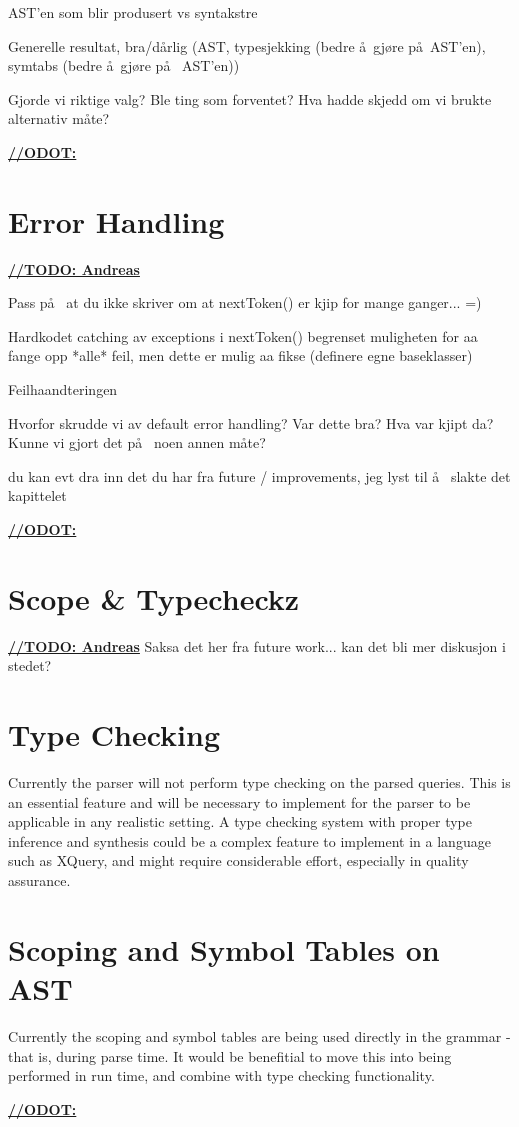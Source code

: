 AST'en som blir produsert vs syntakstre

Generelle resultat, bra/d\aa rlig (AST, typesjekking (bedre \aa~gj\o re p\aa~AST'en),
symtabs (bedre \aa~gj\o re p\aa~ AST'en))

Gjorde vi riktige valg? Ble ting som forventet? Hva hadde skjedd om vi brukte alternativ m\aa te? 

\underline{\textbf{\LARGE //ODOT:}}

\section{Error Handling}
\underline{\textbf{\LARGE //TODO: Andreas}}

Pass p\aa~ at du ikke skriver om at nextToken() er kjip for mange ganger... =)

Hardkodet catching av exceptions i nextToken() begrenset muligheten for aa
fange opp *alle* feil, men dette er mulig aa fikse (definere egne baseklasser)

Feilhaandteringen

Hvorfor skrudde vi av default error handling? Var dette bra? Hva var kjipt da? Kunne vi gjort det p\aa~ noen annen m\aa te?

du kan evt dra inn det du har fra future / improvements, jeg lyst til \aa~ slakte det kapittelet

\underline{\textbf{\LARGE //ODOT:}}


\section{Scope & Typecheckz}

\underline{\textbf{\LARGE //TODO: Andreas}} Saksa det her fra future work... kan det bli mer diskusjon i stedet?

\section{Type Checking}
Currently the parser will not perform type checking on the parsed queries. This
is an essential feature and will be necessary to implement for the parser to be
applicable in any realistic setting. A type checking system with proper type
inference and synthesis could be a complex feature to implement in a language
such as XQuery, and might require considerable effort, especially in quality
assurance. 

\section{Scoping and Symbol Tables on AST}
Currently the scoping and symbol tables are being used directly in the grammar -
that is, during parse time. It would be benefitial to move this into being
performed in run time, and combine with type checking functionality.

\underline{\textbf{\LARGE //ODOT:}}